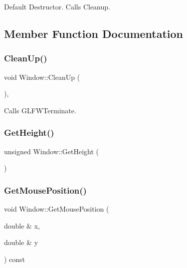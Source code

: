 Default Destructor. Calls Cleanup. 



\subsection{Member Function Documentation}
\mbox{\label{class_window_ab0d4c2fa778638e6fde90fc221124384}} 
\subsubsection{\texorpdfstring{Clean\+Up()}{CleanUp()}}
{\footnotesize\ttfamily void Window\+::\+Clean\+Up (\begin{DoxyParamCaption}{ }\end{DoxyParamCaption})\hspace{0.3cm}{\ttfamily [static]}, {\ttfamily [private]}}



Calls G\+L\+F\+W\+Terminate. 

\mbox{\label{class_window_a19c8d97415b163e5f641388f1d537085}} 
\subsubsection{\texorpdfstring{Get\+Height()}{GetHeight()}}
{\footnotesize\ttfamily unsigned Window\+::\+Get\+Height (\begin{DoxyParamCaption}{ }\end{DoxyParamCaption})}

\mbox{\label{class_window_a65b02b0e52540d4c2c9d13689f4ec45a}} 
\subsubsection{\texorpdfstring{Get\+Mouse\+Position()}{GetMousePosition()}}
{\footnotesize\ttfamily void Window\+::\+Get\+Mouse\+Position (\begin{DoxyParamCaption}\item[{double \&}]{x,  }\item[{double \&}]{y }\end{DoxyParamCaption}) const}



